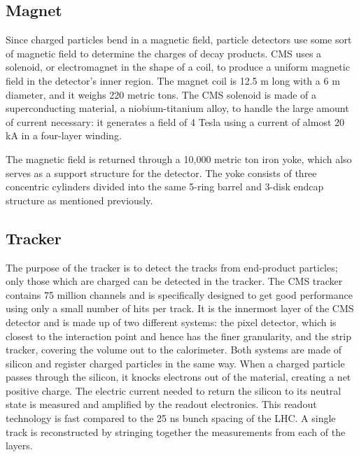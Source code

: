 \subsection{Magnet}
\label{exp:magnet}

Since charged particles bend in a magnetic field, 
particle detectors use some sort of magnetic field to determine 
the charges of decay products.  
CMS uses a solenoid, or electromagnet in the shape of a coil, 
to produce a uniform magnetic field in the detector's inner region.  
The magnet coil is 12.5 m long with a 6 m diameter, 
and it weighs 220 metric tons.  
The CMS solenoid is made of a superconducting material, 
a niobium-titanium alloy, 
to handle the large amount of current necessary: 
it generates a field of 4 Tesla using 
a current of almost 20 kA in a four-layer winding.

The magnetic field is returned through a 10,000 metric ton iron yoke, 
which also serves as a support structure for the detector.  
The yoke consists of three concentric cylinders divided into the same 
5-ring barrel and 3-disk endcap structure as mentioned previously.  

\subsection{Tracker}
\label{exp:tracker}
The purpose of the tracker is to detect the 
tracks from end-product particles;
only those which are charged can be detected in the tracker.  
The CMS tracker contains 75 million channels
and is specifically designed to get good performance 
using only a small number of hits per track.
It is the innermost layer of the CMS detector
and is made up of two different systems: 
the pixel detector, 
which is closest to the interaction point and hence has the finer granularity, 
and the strip tracker, 
covering the volume out to the calorimeter. 
Both systems are made of silicon and register charged particles in the same way. 
When a charged particle passes through the silicon,
it knocks electrons out of the material, 
creating a net positive charge.  
The electric current needed to return the silicon
to its neutral state is measured and amplified
by the readout electronics.  
This readout technology is fast compared to the 
25 ns bunch spacing of the LHC.  
A single track is reconstructed by stringing together
the measurements from each of the layers.  

